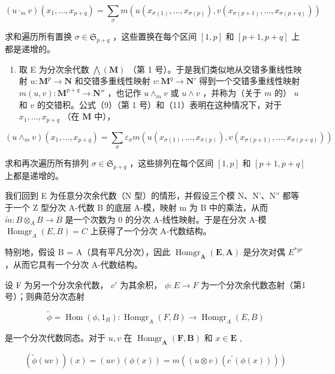 \[
(u \cdot_{m} v) (x _ {1}, \dots , x _ {p + q}) = \sum_ {\sigma} m (u (x _ {\sigma (1)}, \dots , x _ {\sigma (p)}), v (x _ {\sigma (p + 1)}, \dots , x _ {\sigma (p + q)}))
\]

求和遍历所有置换 \(\sigma\in\mathfrak{S}_{p+q}\) ，这些置换在每个区间 \([1,p]\) 和 \([p+1,p+q]\) 上都是递增的。

\begin{enumerate}
\def\labelenumi{(\arabic{enumi})}
\setcounter{enumi}{2}
\tightlist
\item
  取 E 为分次余代数 \(\bigwedge (\mathbf{M})\) （第 1 号）。于是我们类似地从交错多重线性映射 \(u: \mathbf{M}^p \to \mathbf{N}\) 和交错多重线性映射 \(v: \mathbf{M}^q \to \mathbf{N}'\) 得到一个交错多重线性映射 \(m(u, v): \mathbf{M}^{p + q} \to \mathbf{N}''\) ，也记作 \(u \wedge_m v\) 或 \(u \wedge v\) ，并称为（关于 \(m\) 的） \(u\) 和 \(v\) 的交错积。公式（9）（第 1 号）和（11）表明在这种情况下，对于 \(x_1, \ldots, x_{p + q}\) （在 \(\mathbf{M}\) 中），
\end{enumerate}

\[
(u \wedge_ {m} v) (x _ {1}, \dots , x _ {p + q}) = \sum_ {\sigma} \varepsilon_ {\sigma} m (u (x _ {\sigma (1)}, \dots , x _ {\sigma (p)}), v (x _ {\sigma (p + 1)}, \dots , x _ {\sigma (p + q)}))
\]

求和再次遍历所有排列 \(\sigma \in \mathfrak{S}_{p + q}\) ，这些排列在每个区间 \([1, p]\) 和 \([p + 1, p + q]\) 上都是递增的。

我们回到 E 为任意分次余代数（N 型）的情形，并假设三个模 N、N'、N'' 都等于一个 Z 型分次 A-代数 B 的底层 A-模，映射 m 为 B 中的乘法，从而 \(\tilde{m}:B\otimes_{A}B\to B\) 是一个次数为 0 的分次 A-线性映射。于是在分次 A-模 \(\operatorname{Homgr}_{A}(E,B)=C\) 上获得了一个分次 A-代数结构。

特别地，假设 B = A（具有平凡分次），因此 \(\operatorname{Homgr}_{\mathbf{A}}(\mathbf{E}, \mathbf{A})\) 是分次对偶 \(E^{*gr}\) ，从而它具有一个分次 A-代数结构。

设 F 为另一个分次余代数， \(c'\) 为其余积， \(\phi:E\to F\) 为一个分次余代数态射（第1号）；则典范分次态射

\[
\tilde {\phi} = \operatorname{Hom} (\phi , 1 _ {B}): \operatorname{Homgr} _ {A} (F, B) \rightarrow \operatorname{Homgr} _ {A} (E, B)
\]

是一个分次代数同态。对于 \(u, v\) 在 \(\operatorname{Homgr}_{\mathbf{A}}(\mathbf{F}, \mathbf{B})\) 和 \(x \in \mathbf{E}\) ,

\[
(\tilde {\phi} (u v)) (x) = (u v) (\phi (x)) = m ((u \otimes v) (c ^ {\prime} (\phi (x))))
\]

